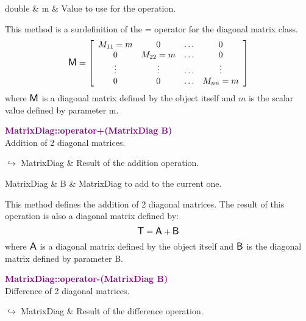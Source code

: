 \begin{tcolorbox}[width=\textwidth,myArgs,tabularx={ll|R}]
double & m & Value to use for the operation.
\end{tcolorbox}

This method is a surdefinition of the = operator for the diagonal matrix class.
\begin{equation*}
\mbox{\large\ensuremath{\mathsf{M}}}=\left[\begin{array}{cccc}
  M_{11}=m & 0 & \hdots & 0\\
  0 & M_{22}=m & \hdots & 0\\
  \vdots & \vdots & \hdots & \vdots\\
  0 & 0 & \hdots & M_{nn}=m
  \end{array}\right]
\end{equation*}
where $\mbox{\large\ensuremath{\mathsf{M}}}$ is a diagonal matrix defined by the object itself and $m$ is the scalar value defined by parameter m.

\textcolor{purple}{\textbf{MatrixDiag::operator+(MatrixDiag B)}}\label{MatrixDiag::operator+(MatrixDiag B)}\\
Addition of 2 diagonal matrices.\vspace*{-0.5em}
\begin{tcolorbox}[grow to left by=-1cm, width=\textwidth-1cm,myArgs,tabularx={l|R}]
$\hookrightarrow$ MatrixDiag & Result of the addition operation.
\end{tcolorbox}

\begin{tcolorbox}[width=\textwidth,myArgs,tabularx={ll|R}]
MatrixDiag & B & MatrixDiag to add to the current one.
\end{tcolorbox}

This method defines the addition of 2 diagonal matrices.
The result of this operation is also a diagonal matrix defined by:
\begin{equation*}
\mbox{\large\ensuremath{\mathsf{T}}} = \mbox{\large\ensuremath{\mathsf{A}}} + \mbox{\large\ensuremath{\mathsf{B}}}
\end{equation*}
where $\mbox{\large\ensuremath{\mathsf{A}}}$ is a diagonal matrix defined by the object itself and $\mbox{\large\ensuremath{\mathsf{B}}}$ is the diagonal matrix defined by parameter B.

\textcolor{purple}{\textbf{MatrixDiag::operator-(MatrixDiag B)}}\label{MatrixDiag::operator-(MatrixDiag B)}\\
Difference of 2 diagonal matrices.\vspace*{-0.5em}
\begin{tcolorbox}[grow to left by=-1cm, width=\textwidth-1cm,myArgs,tabularx={l|R}]
$\hookrightarrow$ MatrixDiag & Result of the difference operation.
\end{tcolorbox}

